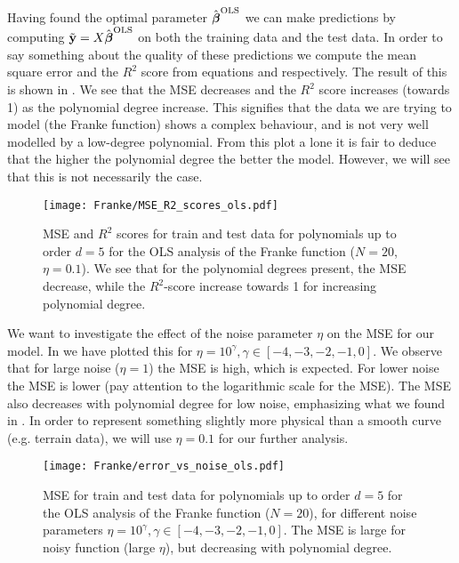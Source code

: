             Having found the optimal parameter $\hat{\boldsymbol{\beta}}^{\text{OLS}}$ we can make predictions by computing $\tilde{\mathbf{y}} = X\hat{\boldsymbol{\beta}}^{\text{OLS}}$ on both the training data and the test data. In order to say something about the quality of these predictions we compute the mean square error and the $R^2$ score from equations  and  respectively. The result of this is shown in . We see that the MSE decreases and the $R^2$ score increases (towards 1) as the polynomial degree increase. This signifies that the data we are trying to model (the Franke function) shows a complex behaviour, and is not very well modelled by a low-degree polynomial. From this plot a lone it is fair to deduce that the higher the polynomial degree the better the model. However, we will see that this is not necessarily the case. 

            \begin{figure}
                \texttt{[image: Franke/MSE\_R2\_scores\_ols.pdf]}
                \caption{MSE and $R^2$ scores for train and test data for polynomials up to order $d=5$ for the OLS analysis of the Franke function ($N=20$, $\eta=0.1$). We  see that for the polynomial degrees present, the MSE decrease, while the $R^2$-score increase towards 1 for increasing polynomial  degree. }
                \label{fig:mse_and_r2_for_order5}
            \end{figure}
            
            
            We want to investigate the effect of the noise parameter $\eta$ on the MSE for our model. In  we have plotted this for $\eta = 10^{\gamma}, \gamma\in[-4,-3,-2,-1,0]$. We observe that for large noise ($\eta=1$) the MSE is high, which is expected. For lower noise the MSE is lower (pay attention to the logarithmic scale for the MSE). The MSE also decreases with polynomial degree for low noise, emphasizing what we found in . In order to represent something slightly more physical than a smooth curve (e.g. terrain data), we will use $\eta=0.1$ for our further analysis. 

            \begin{figure}
                \texttt{[image: Franke/error\_vs\_noise\_ols.pdf]}
                \caption{MSE for train and test data for polynomials up to order $d=5$ for the OLS analysis of the Franke function ($N=20$), for different noise parameters $\eta = 10^{\gamma}, \gamma\in[-4,-3,-2,-1,0]$. The MSE is large for noisy function (large $\eta$), but decreasing with polynomial degree.}
                \label{fig:mse_for_different_noise_ols}
            \end{figure}


